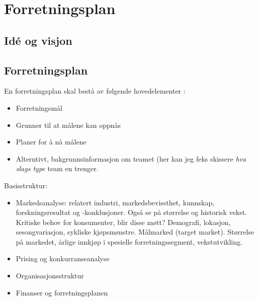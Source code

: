 \chapter{Forretningsplan}
\label{del1}

\section{Idé og visjon}


\section{Forretningsplan}

En forretningsplan skal bestå av følgende hovedelementer
\cite{wiki:business.plan}:

\begin{itemize}
    \item Forretningsmål
    \item Grunner til at målene kan oppnås
    \item Planer for å nå målene
    \item Alterntivt, bakgrunnsinformasjon om teamet (her kan jeg feks skissere
        \textit{hva slags type} team en trenger.
\end{itemize}

Basisstruktur:

\begin{itemize}
  \item Markedsanalyse: relatert industri, markedsbevissthet, kunnskap,
    forskningsresultat og -konklusjoner. Også se på størrelse og historisk
    vekst. Kritiske behov for konsumenter, blir disse møtt? Demografi,
    lokasjon, sesongvariasjon, sykliske kjøpsmønstre. Målmarked (target
    market). Størrelse på markedet, årlige innkjøp i spesielle
    forretningssegment, vekstutvikling.
  \item Prising og konkurranseanalyse
  \item Organisasjonsstruktur
  \item Finanser og forretningsplanen
\end{itemize}











